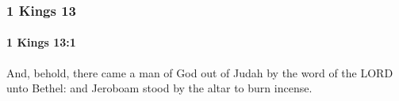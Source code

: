 	\subsubsection{1 Kings 13} %
		\label{1KINGS-13}

		\paragraph{1 Kings 13:1} %
			\label{1KINGS-13-1}

			And, behold, there came a man of God out of Judah by the word of the LORD unto Bethel: and Jeroboam stood by the altar to burn incense.


